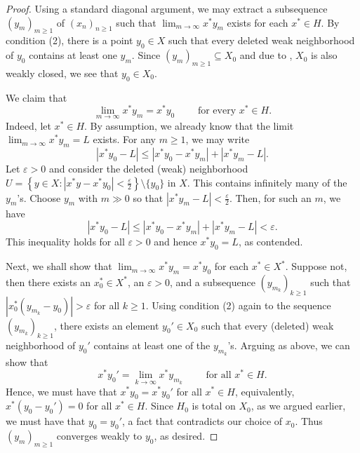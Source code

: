 \documentclass[11pt]{article}
\theoremstyle{thmstyle}
\theoremstyle{defstyle}
\renewcommand{\le}{\leqslant}
\renewcommand{\ge}{\geqslant}
\begin{document}
\begin{proof}
    Using a standard diagonal argument, we may extract a subsequence $(y_m)_{m\ge 1}$ of $(x_n)_{n\ge 1}$ such that $\displaystyle\lim_{m\to\infty} x^\ast y_m$ exists for each $x^\ast\in H$. By condition (2), there is a point $y_0\in X$ such that every deleted weak neighborhood of $y_0$ contains at least one $y_m$. Since $(y_m)_{m\ge 1}\subseteq X_0$ and due to , $X_0$ is also weakly closed, we see that $y_0\in X_0$. 

    We claim that 
    \begin{equation*}
        \lim_{m\to\infty} x^\ast y_m = x^\ast y_0\qquad\text{ for every }x^\ast\in H.
    \end{equation*}
    Indeed, let $x^\ast\in H$. By assumption, we already know that the limit $\displaystyle\lim_{m\to\infty} x^\ast y_m = L$ exists. For any $m\ge 1$, we may write 
    \begin{equation*}
        \left|x^\ast y_0 - L\right|\le \left|x^\ast y_0 - x^\ast y_m\right| + \left|x^\ast y_m - L\right|.
    \end{equation*}
    Let $\varepsilon > 0$ and consider the deleted (weak) neighborhood $U = \left\{y\in X\colon |x^\ast y - x^\ast y_0| < \frac{\varepsilon}{2}\right\}\setminus\{y_0\}$ in $X$. This contains infinitely many of the $y_m$'s. Choose $y_m$ with $m\gg 0$ so that $\left|x^\ast y_m - L\right| < \frac{\varepsilon}{2}$. Then, for such an $m$, we have 
    \begin{equation*}
        \left|x^\ast y_0 - L\right|\le\left|x^\ast y_0 - x^\ast y_m\right| + \left|x^\ast y_m - L\right| < \varepsilon.
    \end{equation*}
    This inequality holds for all $\varepsilon > 0$ and hence $x^\ast y_0 = L$, as contended.

    Next, we shall show that $\displaystyle\lim_{m\to\infty} x^\ast y_m = x^\ast y_0$ for each $x^\ast\in X^\ast$. Suppose not, then there exists an $x_0^\ast\in X^\ast$, an $\varepsilon > 0$, and a subsequence $(y_{m_k})_{k\ge 1}$ such that $\left|x_0^\ast(y_{m_k} - y_0)\right| > \varepsilon$ for all $k\ge 1$. Using condition (2) again to the sequence $(y_{m_k})_{k\ge 1}$, there exists an element $y_0'\in X_0$ such that every (deleted) weak neighborhood of $y_0'$ contains at least one of the $y_{m_k}$'s. Arguing as above, we can show that 
    \begin{equation*}
        x^\ast y_0' = \lim_{k\to\infty} x^\ast y_{m_k}\qquad\text{ for all }x^\ast\in H.
    \end{equation*}
    Hence, we must have that $x^\ast y_0 = x^\ast y_0'$ for all $x^\ast\in H$, equivalently, $x^\ast(y_0 - y_0') = 0$ for all $x^\ast\in H$. Since $H_0$ is total on $X_0$, as we argued earlier, we must have that $y_0 = y_0'$, a fact that contradicts our choice of $x_0$. Thus $(y_m)_{m\ge 1}$ converges weakly to $y_0$, as desired.


\end{proof}
\end{document}
